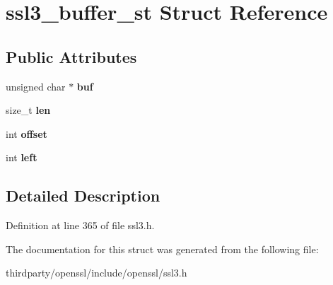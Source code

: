 \hypertarget{structssl3__buffer__st}{}\section{ssl3\+\_\+buffer\+\_\+st Struct Reference}
\label{structssl3__buffer__st}
\subsection*{Public Attributes}
\begin{DoxyCompactItemize}
\item 
\mbox{\label{structssl3__buffer__st_a7b769263d556c41433a8cb932dadd8f7}} 
unsigned char $\ast$ {\bfseries buf}
\item 
\mbox{\label{structssl3__buffer__st_adfe7ca1f516b5502e927d8731608085b}} 
size\+\_\+t {\bfseries len}
\item 
\mbox{\label{structssl3__buffer__st_a9102947618e368b7454b8f3a32f8bf09}} 
int {\bfseries offset}
\item 
\mbox{\label{structssl3__buffer__st_a5332410a4d9c20e73fd3dd36699436cb}} 
int {\bfseries left}
\end{DoxyCompactItemize}


\subsection{Detailed Description}


Definition at line 365 of file ssl3.\+h.



The documentation for this struct was generated from the following file\+:\begin{DoxyCompactItemize}
\item 
thirdparty/openssl/include/openssl/ssl3.\+h\end{DoxyCompactItemize}
